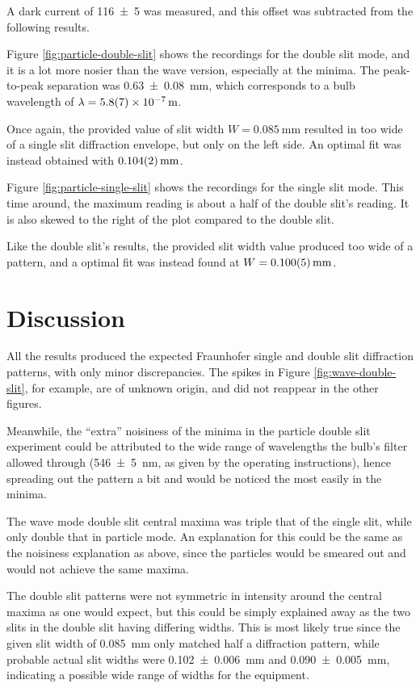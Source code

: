\documentclass[a4paper]{scrartcl}
\begin{document}
A dark current of \SI{116 \pm 5}{} was measured, and this offset was subtracted from the following results.

Figure \ref{fig:particle-double-slit} shows the recordings for the double slit mode, and it is a lot more nosier than the wave version, especially at the minima. The peak-to-peak separation was \SI{0.63 \pm 0.08}{\milli\metre}, which corresponds to a bulb wavelength of \(\lambda = \SI{5.8 \pm 0.7 e-7}{\metre}\).

Once again, the provided value of slit width \(W = \SI{0.085}{\milli\metre}\) resulted in too wide of a single slit diffraction envelope, but only on the left side. An optimal fit was instead obtained with \(\SI{0.104 \pm 0.002}{\milli\metre}\).

Figure \ref{fig:particle-single-slit} shows the recordings for the single slit mode. This time around, the maximum reading is about a half of the double slit's reading. It is also skewed to the right of the plot compared to the double slit.

Like the double slit's results, the provided slit width value produced too wide of a pattern, and a optimal fit was instead found at \(W = \SI{0.100 \pm 0.005}{\milli\metre}\).

\section{Discussion}
All the results produced the expected Fraunhofer single and double slit diffraction patterns, with only minor discrepancies. The spikes in Figure \ref{fig:wave-double-slit}, for example, are of unknown origin, and did not reappear in the other figures.

Meanwhile, the ``extra'' noisiness of the minima in the particle double slit experiment could be attributed to the wide range of wavelengths the bulb's filter allowed through (\SI{546 \pm 5}{\nano\metre}, as given by the operating instructions), hence spreading out the pattern a bit and would be noticed the most easily in the minima.

The wave mode double slit central maxima was triple that of the single slit, while only double that in particle mode. An explanation for this could be the same as the noisiness explanation as above, since the particles would be smeared out and would not achieve the same maxima.

The double slit patterns were not symmetric in intensity around the central maxima as one would expect, but this could be simply explained away as the two slits in the double slit having differing widths. This is most likely true since the given slit width of \SI{0.085}{\milli\metre} only matched half a diffraction pattern, while probable actual slit widths were \SI{0.102 \pm 0.006}{\milli\metre} and \SI{0.090 \pm 0.005}{\milli\metre}, indicating a possible wide range of widths for the equipment.
\end{document}
